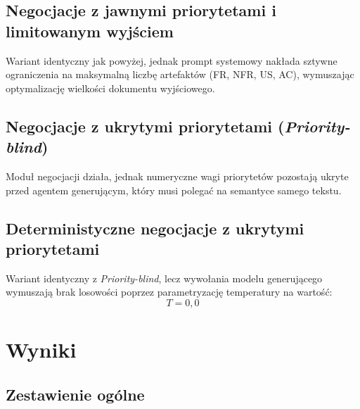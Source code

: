\documentclass[conference]{IEEEtran}
\begin{document}
\subsection{Negocjacje z jawnymi priorytetami i limitowanym wyjściem}
Wariant identyczny jak powyżej, jednak prompt systemowy nakłada sztywne ograniczenia na maksymalną liczbę artefaktów (FR, NFR, US, AC), wymuszając optymalizację wielkości dokumentu wyjściowego.

\subsection{Negocjacje z ukrytymi priorytetami (\textit{Priority-blind})}
Moduł negocjacji działa, jednak numeryczne wagi priorytetów pozostają ukryte przed agentem generującym, który musi polegać na semantyce samego tekstu.

\subsection{Deterministyczne negocjacje z ukrytymi priorytetami}
Wariant identyczny z \textit{Priority-blind}, lecz wywołania modelu generującego wymuszają brak losowości poprzez parametryzację temperatury na wartość:
\[
T = 0{,}0
\]

\section{Wyniki}

\subsection{Zestawienie ogólne}
\end{document}
